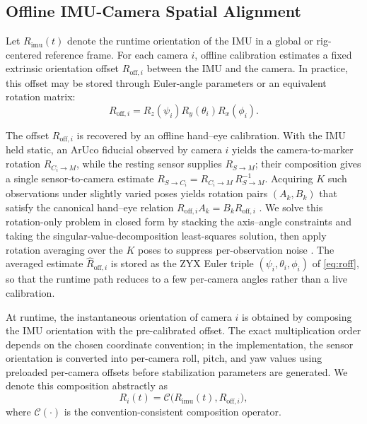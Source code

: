\documentclass[journal]{IEEEtran}
\begin{document}
\subsection{Offline IMU-Camera Spatial Alignment}
Let $R_{\mathrm{imu}}(t)$ denote the runtime orientation of the IMU in a global or rig-centered reference frame. For each camera $i$, offline calibration estimates a fixed extrinsic orientation offset $R_{\mathrm{off},i}$ between the IMU and the camera. In practice, this offset may be stored through Euler-angle parameters or an equivalent rotation matrix:
\begin{equation}
R_{\mathrm{off},i} = R_z(\psi_i) R_y(\theta_i) R_x(\phi_i).
\label{eq:roff}
\end{equation}

The offset $R_{\mathrm{off},i}$ is recovered by an offline hand--eye calibration. With the IMU held static, an ArUco fiducial \cite{garrido2014aruco} observed by camera $i$ yields the camera-to-marker rotation $R_{C_i\to M}$, while the resting sensor supplies $R_{S\to M}$; their composition gives a single sensor-to-camera estimate $R_{S\to C_i}=R_{C_i\to M}\,R_{S\to M}^{-1}$. Acquiring $K$ such observations under slightly varied poses yields rotation pairs $(A_k,B_k)$ that satisfy the canonical hand--eye relation $R_{\mathrm{off},i}A_k=B_kR_{\mathrm{off},i}$ \cite{tsai1989hand}. We solve this rotation-only problem in closed form by stacking the axis--angle constraints and taking the singular-value-decomposition least-squares solution, then apply rotation averaging over the $K$ poses to suppress per-observation noise \cite{nguyen2018covariance}. The averaged estimate $\hat R_{\mathrm{off},i}$ is stored as the ZYX Euler triple $(\psi_i,\theta_i,\phi_i)$ of \eqref{eq:roff}, so that the runtime path reduces to a few per-camera angles rather than a live calibration.

At runtime, the instantaneous orientation of camera $i$ is obtained by composing the IMU orientation with the pre-calibrated offset. The exact multiplication order depends on the chosen coordinate convention; in the implementation, the sensor orientation is converted into per-camera roll, pitch, and yaw values using preloaded per-camera offsets before stabilization parameters are generated. We denote this composition abstractly as
\begin{equation}
R_i(t) = \mathcal{C}\big(R_{\mathrm{imu}}(t), R_{\mathrm{off},i}\big),
\label{eq:composition}
\end{equation}
where $\mathcal{C}(\cdot)$ is the convention-consistent composition operator.
\end{document}
